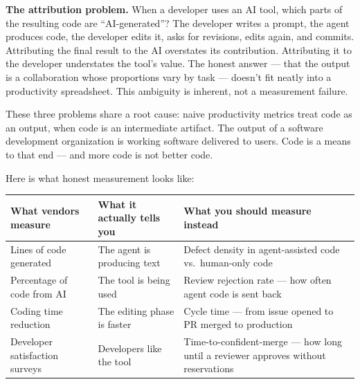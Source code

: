 \documentclass[
  a4paper,
  DIV=11,
  numbers=noendperiod]{scrreprt}
\newcounter{none} %
\begin{document}
\textbf{The attribution problem.} When a developer uses an AI tool,
which parts of the resulting code are ``AI-generated''? The developer
writes a prompt, the agent produces code, the developer edits it, asks
for revisions, edits again, and commits. Attributing the final result to
the AI overstates its contribution. Attributing it to the developer
understates the tool's value. The honest answer --- that the output is a
collaboration whose proportions vary by task --- doesn't fit neatly into
a productivity spreadsheet. This ambiguity is inherent, not a
measurement failure.

These three problems share a root cause: naive productivity metrics
treat code as an output, when code is an intermediate artifact. The
output of a software development organization is working software
delivered to users. Code is a means to that end --- and more code is not
better code.

Here is what honest measurement looks like:

{\def\LTcaptype{none} %
\begin{longtable}[]{@{}
  >{\raggedright\arraybackslash}p{}
  >{\raggedright\arraybackslash}p{}
  >{\raggedright\arraybackslash}p{}@{}}
\toprule\noalign{}
\begin{minipage}[b]{\linewidth}\raggedright
What vendors measure
\end{minipage} & \begin{minipage}[b]{\linewidth}\raggedright
What it actually tells you
\end{minipage} & \begin{minipage}[b]{\linewidth}\raggedright
What you should measure instead
\end{minipage} \\
\midrule\noalign{}
\endhead
\bottomrule\noalign{}
\endlastfoot
Lines of code generated & The agent is producing text & Defect density
in agent-assisted code vs.~human-only code \\
Percentage of code from AI & The tool is being used & Review rejection
rate --- how often agent code is sent back \\
Coding time reduction & The editing phase is faster & Cycle time ---
from issue opened to PR merged to production \\
Developer satisfaction surveys & Developers like the tool &
Time-to-confident-merge --- how long until a reviewer approves without
reservations \\
\end{longtable}
}
\end{document}

